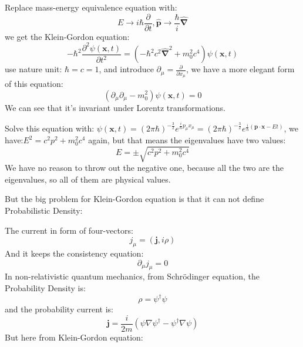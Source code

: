\documentclass[12pt]{article}
\numberwithin{equation}{section}
\begin{document}
\begin{enumerate}
	Replace mass-energy equivalence equation with:
	\begin{equation}
		E \rightarrow i\hbar \frac{\partial}{\partial{t}}, 
		\hat{\mathbf{p}} \rightarrow \frac{\hbar}{i} \hat{\bm{\nabla}}
	\end{equation}
	we get the Klein-Gordon equation:
	\begin{equation}
		-\hbar^2\frac{\partial^2{\psi(\mathbf{x},t)}}{\partial{t}^2}=
		(-\hbar^2 c^2\hat{\bm{\nabla}}^2+m^2_{0}c^4)\psi(\mathbf{x},t)
	\end{equation}
	use nature unit: $\hbar=c=1$, and introduce $\partial_{\mu}=\frac{\partial}{\partial{x}_{\mu}}$, 
	we have a more elegant form of this equation:
	\begin{equation}
		(\partial_{\mu}\partial_{\mu}-m^2_0)\psi(\mathbf{x},t)=0
	\end{equation}
	We can see that it's invariant under Lorentz transformations.\par
	Solve this equation with: 
	$\psi(\mathbf{x},t)=(2\pi\hbar)^{-\frac{3}{2}}e^{\frac{i}{\hbar} p_\mu x_\mu}=
	(2\pi\hbar)^{-\frac{3}{2}}e^{\frac{i}{\hbar} (\mathbf{p}\cdot\mathbf{x}-Et)}$, 
	we have:$E^2=c^2p^2+m_0^2c^4$ again, but that means the eigenvalues have two values:
	\begin{equation}
		E=\pm\sqrt{c^2p^2+m_0^2c^4}
	\end{equation}
	We have no reason to throw out the negative one, because all the two are the eigenvalues, so all of  them are physical values.\par
	 But {\color{orange}the big problem for Klein-Gordon equation is that it can not define Probabilistic Density}:\par
	The current in form of four-vectors:
	\begin{equation}j_\mu=(\mathbf{j}, i\rho)\end{equation}
	And it keeps the consistency equation:
	\begin{equation}\partial_\mu j_\mu=0\end{equation}
	In non-relativistic quantum mechanics, from Schr\"{o}dinger equation, the Probability Density is:
	\begin{equation}\rho=\psi^\dag\psi\end{equation}
	and the probability current is:
	\begin{equation}
		\mathbf{j}=\frac{i}{2m}(\psi\nabla\psi^\dag-\psi^\dag\nabla\psi)
	\end{equation}
	But here from Klein-Gordon equation:
	\begin{equation}

\end{equation}
\end{enumerate}
\end{document}
